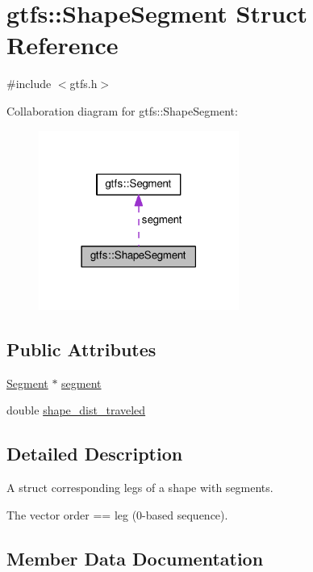 \hypertarget{structgtfs_1_1ShapeSegment}{}\section{gtfs\+:\+:Shape\+Segment Struct Reference}
\label{structgtfs_1_1ShapeSegment}


{\ttfamily \#include $<$gtfs.\+h$>$}



Collaboration diagram for gtfs\+:\+:Shape\+Segment\+:\nopagebreak
\begin{figure}[H]
\begin{center}
\leavevmode
\includegraphics[width=186pt]{structgtfs_1_1ShapeSegment__coll__graph}
\end{center}
\end{figure}
\subsection*{Public Attributes}
\begin{DoxyCompactItemize}
\item 
\hyperlink{classgtfs_1_1Segment}{Segment} $\ast$ \hyperlink{structgtfs_1_1ShapeSegment_a30eb5db589498e40bb110402314a602b}{segment}
\item 
double \hyperlink{structgtfs_1_1ShapeSegment_a64afdd03235b9bc256fc18652c6f9c47}{shape\+\_\+dist\+\_\+traveled}
\end{DoxyCompactItemize}


\subsection{Detailed Description}
A struct corresponding legs of a shape with segments.

The vector order == leg (0-\/based sequence). 

\subsection{Member Data Documentation}
\mbox{\label{structgtfs_1_1ShapeSegment_a30eb5db589498e40bb110402314a602b}} 
